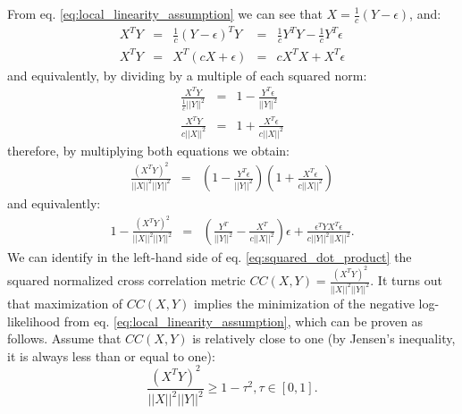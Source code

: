 From eq. \eqref{eq:local_linearity_assumption} we can see that $X = \frac{1}{c}(Y - \epsilon)$, and:
\begin{equation}\label{eq:dot_products}
    \begin{array}{lclcl}
        X^{T}Y &=& \frac{1}{c}(Y-\epsilon)^{T}Y &=& \frac{1}{c}Y^{T}Y - \frac{1}{c}Y^{T}\epsilon\\[2mm]
        X^{T}Y &=& X^{T}(cX + \epsilon) &=& cX^{T}X + X^{T}\epsilon
    \end{array}
\end{equation}
and equivalently, by dividing by a multiple of each squared norm:
\begin{equation}\label{eq:normalized_dot_products}
    \begin{array}{lclcl}
        \frac{X^{T}Y}{\frac{1}{c}||Y||^{2}} &=& 1 - \frac{Y^{T}\epsilon}{||Y||^{2}}\\[2mm]
        \frac{X^{T}Y}{c||X||^{2}} &=& 1 + \frac{X^{T}\epsilon}{c||X||^{2}}
    \end{array}
\end{equation}
therefore, by multiplying both equations we obtain:
\begin{equation}\label{eq:squared_dot_product}
    \begin{array}{lcl}
        \frac{\left(X^{T}Y\right)^{2}}{||X||^{2}||Y||^{2}} &=& \left(1 - \frac{Y^{T}\epsilon}{||Y||^{2}}\right)\left(1 + \frac{X^{T}\epsilon}{c||X||^{2}}\right)
    \end{array}
\end{equation}
and equivalently:
\begin{equation}\label{eq:squared_dot_product}
    \begin{array}{lcl}
        1-\frac{\left(X^{T}Y\right)^{2}}{||X||^{2}||Y||^{2}} &=& \left(\frac{Y^{T}}{||Y||^{2}} - \frac{X^{T}}{c||X||^{2}}\right)\epsilon + \frac{\epsilon^{T}Y X^{T}\epsilon}{c||Y||^{2}||X||^{2}}.
    \end{array}
\end{equation}
We can identify in the left-hand side of eq. \eqref{eq:squared_dot_product} the squared normalized cross correlation metric $CC(X, Y) = \frac{\left(X^{T}Y\right)^{2}}{||X||^{2}||Y||^{2}}$. It turns out that maximization of $CC(X, Y)$ implies the minimization of the negative log-likelihood from eq. \eqref{eq:local_linearity_assumption}, which can be proven as follows. Assume that $CC(X, Y)$ is relatively close to one (by Jensen's inequality, it is always less than or equal to one):
\begin{equation}\label{eq:hypothesis_tau}
    \frac{\left(X^{T}Y\right)^{2}}{||X||^{2}||Y||^{2}} \geq 1-\tau^{2}, \tau\in[0,1].
\end{equation}
